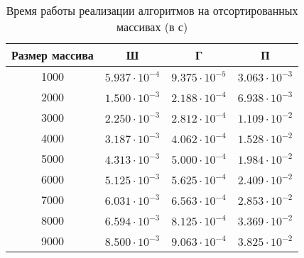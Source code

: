 \begin{table}[h]
	\begin{center}
		\begin{threeparttable}
			\captionsetup{justification=raggedright,singlelinecheck=off}
			\caption{Время работы реализации алгоритмов на отсортированных массивах (в с)}
			\label{tbl:time_measurements_sorted}
			\begin{tabular}{|c|c|c|c|}
				\hline
				Размер массива &  Ш  & Г & П \\
				\hline
				1000 &$ 5.937\cdot 10^{-4} $&$ 9.375\cdot 10^{-5} $&$ 3.063\cdot 10^{-3}$\\
				\hline
				2000 &$ 1.500\cdot 10^{-3} $&$ 2.188\cdot 10^{-4} $&$ 6.938\cdot 10^{-3}$\\
				\hline
				3000 &$ 2.250\cdot 10^{-3} $&$ 2.812\cdot 10^{-4} $&$ 1.109\cdot 10^{-2}$\\
				\hline
				4000 &$ 3.187\cdot 10^{-3} $&$ 4.062\cdot 10^{-4} $&$ 1.528\cdot 10^{-2}$\\
				\hline
				5000 &$ 4.313\cdot 10^{-3} $&$ 5.000\cdot 10^{-4} $&$ 1.984\cdot 10^{-2}$\\
				\hline
				6000 &$ 5.125\cdot 10^{-3} $&$ 5.625\cdot 10^{-4} $&$ 2.409\cdot 10^{-2}$\\
				\hline
				7000 &$ 6.031\cdot 10^{-3} $&$ 6.563\cdot 10^{-4} $&$ 2.853\cdot 10^{-2}$\\
				\hline
				8000 &$ 6.594\cdot 10^{-3} $&$ 8.125\cdot 10^{-4} $&$ 3.369\cdot 10^{-2}$\\
				\hline
				9000 &$ 8.500\cdot 10^{-3} $&$ 9.063\cdot 10^{-4} $&$ 3.825\cdot 10^{-2}$\\
				\hline		
			\end{tabular}
		\end{threeparttable}
	\end{center}
\end{table}


